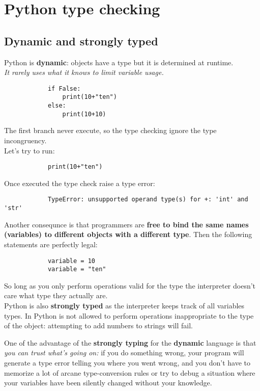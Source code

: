 \documentclass[12pt]{article}
\begin{document}
\section{Python type checking}
	\subsection{Dynamic and strongly typed}
		Python is \textbf{dynamic}: objects have a type but it is determined at runtime. \\
		\textit{It rarely uses what it knows to limit variable usage.}
		
		\begin{lstlisting}
			if False:
				print(10+"ten") 
			else:
				print(10+10)
		\end{lstlisting}
		
		The first branch never execute, so the type checking ignore the type incongruency.\\
		Let's try to run:
		
		\begin{lstlisting}
			print(10+"ten")
		\end{lstlisting}
		
		Once executed the type check raise a type error:
		
		\begin{lstlisting}
			TypeError: unsupported operand type(s) for +: 'int' and 'str'
		\end{lstlisting}
		
		Another consequnce is that programmers are \textbf{free to bind the same names (variables) to different objects with a different type}. Then the following statements are perfectly legal:
		
		\begin{lstlisting}
			variable = 10
			variable = "ten"
		\end{lstlisting}
		
		So long as you only perform operations valid for the type the interpreter doesn't care what type they actually are. \\
		
		Python is also \textbf{strongly typed} as the interpreter keeps track of all variables types. In Python is not allowed to perform operations inappropriate to the type of the object: attempting to add numbers to strings will fail.
		
		One of the advantage of the \textbf{strongly typing} for the \textbf{dynamic} language is that \textit{you can trust what's going on:} if you do something wrong, your program will generate a type error telling you where you went wrong, and you don't have to memorize a lot of arcane type-conversion rules or try to debug a situation where your variables have been silently changed without your knowledge.
		
\end{document}
